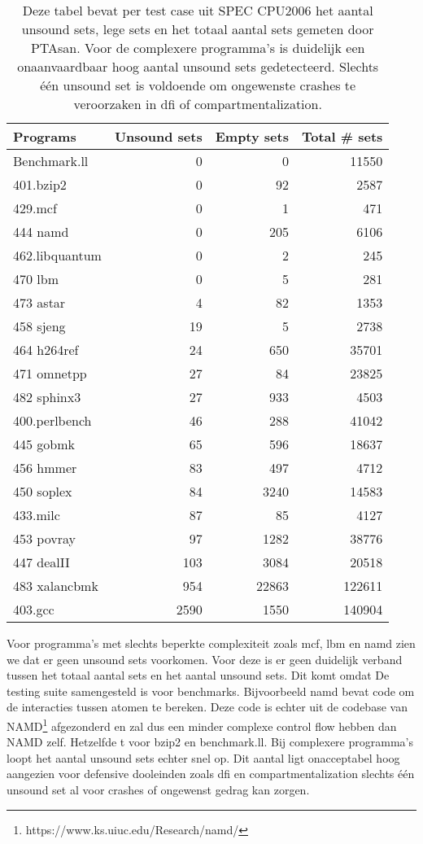 \documentclass[conference]{IEEEtran}
\begin{document}
\begin{table}[htbp]
    \begin{center}
\begin{tabular}{|l|rr|r|}
\hline
Programs       & Unsound sets & Empty sets & Total \# sets \\ 
\hline
\hline
Benchmark.ll   & 0   & 0     & 11550 \\ 
401.bzip2      & 0   & 92    & 2587  \\ 
429.mcf        & 0   & 1     & 471   \\ 
444 namd       & 0   & 205   & 6106  \\ 
462.libquantum & 0   & 2     & 245   \\ 
470 lbm        & 0   & 5     & 281   \\ 
473 astar      & 4   & 82    & 1353  \\ 
458 sjeng      & 19  & 5     & 2738  \\ 
464 h264ref    & 24  & 650   & 35701 \\ 
471 omnetpp    & 27  & 84    & 23825 \\ 
482 sphinx3    & 27  & 933   & 4503  \\ 
400.perlbench  & 46  & 288   & 41042 \\ 
445 gobmk      & 65  & 596   & 18637 \\ 
456 hmmer      & 83  & 497   & 4712  \\ 
450 soplex     & 84  & 3240  & 14583 \\ 
433.milc       & 87  & 85    & 4127  \\ 
453 povray     & 97  & 1282  & 38776 \\ 
447 dealII     & 103 & 3084  & 20518 \\ 
483 xalancbmk  & 954 & 22863 & 122611\\ 
403.gcc        & 2590& 1550  & 140904\\ 
\hline
\end{tabular}
\end{center}
\caption{
Deze tabel bevat per test case uit SPEC CPU2006 het aantal unsound sets, lege sets en het totaal aantal sets gemeten door PTAsan. Voor de complexere programma's is duidelijk een onaanvaardbaar hoog aantal unsound sets gedetecteerd. Slechts één unsound set is voldoende om ongewenste crashes te veroorzaken in \gls{dfi} of compartmentalization.
}
\end{table}

Voor programma's met slechts beperkte complexiteit zoals mcf, lbm en namd zien we dat er geen unsound sets voorkomen. Voor deze is er geen duidelijk verband tussen het totaal aantal sets en het aantal unsound sets. Dit komt omdat De testing suite samengesteld is voor benchmarks. Bijvoorbeeld namd bevat code om de interacties tussen atomen te bereken. Deze code is echter uit de codebase van NAMD\footnote{https://www.ks.uiuc.edu/Research/namd/} afgezonderd en zal dus een minder complexe control flow hebben dan NAMD zelf. Hetzelfde t voor bzip2 en benchmark.ll. Bij complexere programma's loopt het aantal unsound sets echter snel op. Dit aantal ligt onacceptabel hoog aangezien voor defensive dooleinden zoals \gls{dfi} en compartmentalization\cite{lefeuvre_sok_2024} slechts één unsound set al voor crashes of ongewenst gedrag kan zorgen. 
\end{document}
